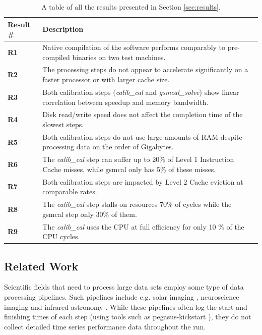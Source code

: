  \begin{table}[!htb]
 \begin{center}
  \begin{tabular}{ l | p{130mm} }
    \hline
    Result \# & Description  \\ \hline
    \hline
    \textbf{R1} & Native compilation of the software performs comparably to pre-compiled binaries on two test machines. \\ \hline
    \textbf{R2} &  The processing steps do not appear to accelerate significantly on a faster processor or with larger cache size. \\ \hline
    \textbf{R3} & Both calibration steps (\textit{calib\_cal} and \textit{gsmcal\_solve}) show linear correlation between speedup and memory bandwidth. \\ \hline
    \textbf{R4} &  Disk read/write speed does not affect the completion time of the slowest steps. \\ \hline
    \textbf{R5} & Both calibration steps do not use large amounts of RAM despite processing data on the order of Gigabytes. \\ \hline
    \textbf{R6} & The \textit{calib\_cal} step can suffer up to 20\% of Level 1 Instruction Cache misses, while gsmcal only has 5\% of these misses. \\ \hline
    \textbf{R7} & Both calibration steps are impacted by Level 2 Cache eviction at comparable rates. \\ \hline
    \textbf{R8} & The \textit{calib\_cal} step stalls on resources 70\% of cycles while the gsmcal step only 30\% of them. \\ \hline
    \textbf{R9} & The \textit{calib\_cal} uses the CPU at full efficiency for only 10 \% of the CPU cycles. \\ \hline
    \hline
  \end{tabular}   
  \caption{A table of all the results presented in Section \ref{sec:results}.}
  \label{table:results}
   \end{center}
 \end{table}
 
 
\subsection{Related Work}\label{sec:related}

Scientific fields that need to process large data sets employ some type of data processing pipelines.  Such pipelines include e.g. solar imaging \citep{solar_pipeline}, neuroscience imaging \citep{optimize_pipeline} and infrared astronomy \citep{herschel}. While these pipelines often log the start and finishing times of each step (using tools such as pegasus-kickstart \citep{kickstart}), they do not collect detailed time series performance data throughout the run. 

